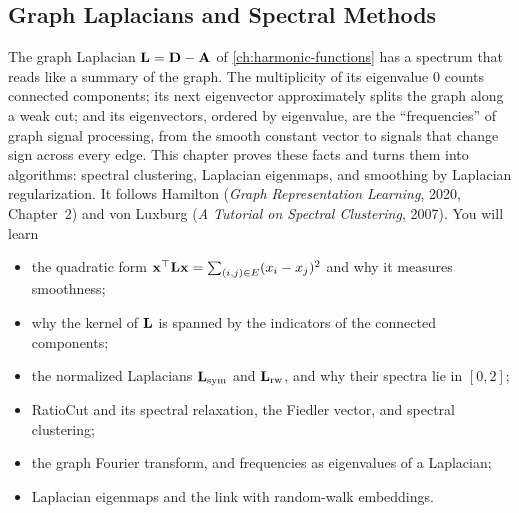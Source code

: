 \begin{notechapter}
\forgetcs\bA{}
\forgetcs\bD{}
\forgetcs\bL{}
\forgetcs\bP{}
\forgetcs\bI{}
\forgetcs\bU{}
\forgetcs\bM{}
\forgetcs\bY{}
\forgetcs\bV{}
\forgetcs\bx{}
\forgetcs\by{}
\forgetcs\bz{}
\forgetcs\bZ{}
\forgetcs\be{}
\forgetcs\bv{}
\forgetcs\bone{}
\forgetcs\vol{}
\forgetcs\cut{}
\chapter{Graph Laplacians and Spectral Methods}\label{ch:graph-laplacians}

\begin{chapterintro}
The graph Laplacian $\mathbf{L} = \mathbf{D} - \mathbf{A}$ of \cref{ch:harmonic-functions} has a spectrum that reads like a summary of
the graph. The multiplicity of its eigenvalue $0$ counts connected components; its next eigenvector
approximately splits the graph along a weak cut; and its eigenvectors, ordered by eigenvalue, are the
``frequencies'' of graph signal processing, from the smooth constant vector to signals that
change sign across every edge. This chapter proves these facts and turns them into
algorithms: spectral clustering, Laplacian eigenmaps, and smoothing by Laplacian
regularization. It follows Hamilton (\emph{Graph Representation Learning}, 2020, Chapter~2)
and von Luxburg (\emph{A Tutorial on Spectral Clustering}, 2007). You will learn
\begin{itemize}[nosep]
  \item the quadratic form $\mathbf{x}^\top\mathbf{L}\mathbf{x} = \sum_{(i,j)\in E}(x_i - x_j)^2$ and why it measures smoothness;
  \item why the kernel of $\mathbf{L}$ is spanned by the indicators of the connected components;
  \item the normalized Laplacians $\mathbf{L}_{\mathrm{sym}}$ and $\mathbf{L}_{\mathrm{rw}}$, and why their spectra lie in $[0, 2]$;
  \item RatioCut and its spectral relaxation, the Fiedler vector, and spectral clustering;
  \item the graph Fourier transform, and frequencies as eigenvalues of a Laplacian;
  \item Laplacian eigenmaps and the link with random-walk embeddings.
\end{itemize}
\end{chapterintro}


\end{notechapter}
